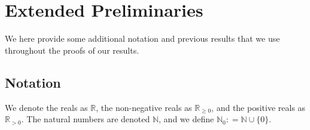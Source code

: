 \documentclass[twoside,11pt]{article}
\newcommand{\nats}{\mathbb{N}}
\newcommand{\natswith}{\nats_{0}}
\newcommand{\reals}{\mathbb{R}}
\newcommand{\realspos}{\reals_{>0}}
\newcommand{\realsnonneg}{\reals_{\geq 0}}
\newcommand{\states}{\mathcal{X}}
\newcommand{\lexp}{\underline{\mathbb{E}}_{\rateset,\mathcal{M}}}
\newcommand{\gambles}{\mathcal{L}}
\newcommand{\rateset}{\mathcal{Q}}
\newcommand{\coloneqq}{:\!=}
\begin{document}


\appendix
{}

%


\newpage


\section{Extended Preliminaries}

We here provide some additional notation and previous results that we use throughout the proofs of our results.

\subsection{Notation}

We denote the reals as $\reals$, the non-negative reals as $\realsnonneg$, and the positive reals as $\realspos$. The natural numbers are denoted $\nats$, and we define $\natswith\coloneqq\nats\cup\{0\}$.
\end{document}
